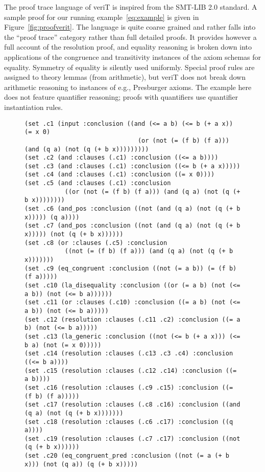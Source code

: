 \documentclass{llncs}
\begin{document}
The proof trace language of veriT is inspired from the SMT-LIB 2.0 standard.  A
sample proof for our running example~\ref{eq:example} is given in
Figure~\ref{fig:proofverit}.  The language is quite coarse grained and rather
falls into the ``proof trace'' category rather than full detailed proofs.  It
provides however a full account of the resolution proof, and equality reasoning
is broken down into applications of the congruence and transitivity instances of
the axiom schemas for equality.  Symmetry of equality is silently used
uniformly.  Special proof rules are assigned to theory lemmas (from arithmetic),
but veriT does not break down arithmetic reasoning to instances of e.g.,
Presburger axioms.  The example here does not feature quantifier reasoning;
proofs with quantifiers use quantifier instantiation rules.

\begin{figure}
{\scriptsize
\begin{verbatim}
(set .c1 (input :conclusion ((and (<= a b) (<= b (+ a x)) (= x 0)
                               (or (not (= (f b) (f a))) (and (q a) (not (q (+ b x)))))))))
(set .c2 (and :clauses (.c1) :conclusion ((<= a b))))
(set .c3 (and :clauses (.c1) :conclusion ((<= b (+ a x)))))
(set .c4 (and :clauses (.c1) :conclusion ((= x 0))))
(set .c5 (and :clauses (.c1) :conclusion
           ((or (not (= (f b) (f a))) (and (q a) (not (q (+ b x))))))))
(set .c6 (and_pos :conclusion ((not (and (q a) (not (q (+ b x))))) (q a))))
(set .c7 (and_pos :conclusion ((not (and (q a) (not (q (+ b x))))) (not (q (+ b x))))))
(set .c8 (or :clauses (.c5) :conclusion
           ((not (= (f b) (f a))) (and (q a) (not (q (+ b x)))))))
(set .c9 (eq_congruent :conclusion ((not (= a b)) (= (f b) (f a)))))
(set .c10 (la_disequality :conclusion ((or (= a b) (not (<= a b)) (not (<= b a))))))
(set .c11 (or :clauses (.c10) :conclusion ((= a b) (not (<= a b)) (not (<= b a)))))
(set .c12 (resolution :clauses (.c11 .c2) :conclusion ((= a b) (not (<= b a)))))
(set .c13 (la_generic :conclusion ((not (<= b (+ a x))) (<= b a) (not (= x 0)))))
(set .c14 (resolution :clauses (.c13 .c3 .c4) :conclusion ((<= b a))))
(set .c15 (resolution :clauses (.c12 .c14) :conclusion ((= a b))))
(set .c16 (resolution :clauses (.c9 .c15) :conclusion ((= (f b) (f a)))))
(set .c17 (resolution :clauses (.c8 .c16) :conclusion ((and (q a) (not (q (+ b x)))))))
(set .c18 (resolution :clauses (.c6 .c17) :conclusion ((q a))))
(set .c19 (resolution :clauses (.c7 .c17) :conclusion ((not (q (+ b x))))))
(set .c20 (eq_congruent_pred :conclusion ((not (= a (+ b x))) (not (q a)) (q (+ b x)))))

\end{verbatim}}
\end{figure}
\end{document}
